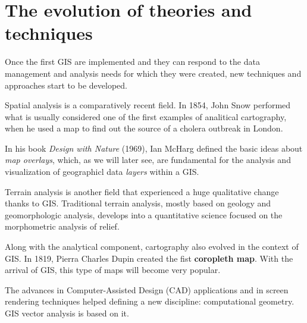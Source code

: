 \section{The evolution of theories and techniques}

Once the first GIS are implemented and they can respond to the data management and analysis needs for which they were created, new techniques and approaches start to be developed. 

Spatial analysis is a comparatively recent field. In 1854, John Snow performed what is usually considered one of the first examples of analitical cartography, when he used a map to find out the source of a cholera outbreak in London.

In his book \emph{Design with Nature} (1969), Ian McHarg defined the basic ideas about  \emph{map overlays}, which, as we will later see, are fundamental for the analysis and visualization of geographicl data \emph{layers} within a GIS.

Terrain analysis is another field that experienced a huge qualitative change thanks to GIS. Traditional terrain analysis, mostly based on geology and geomorphologic analysis, develops into a quantitative science focused on the morphometric analysis of relief.

Along with the analytical component, cartography also evolved in the context of GIS. In 1819, Pierra Charles Dupin created the fist \textbf{coropleth map}. With the arrival of GIS, this type of maps will become very popular.

The advances in Computer-Assisted Design (CAD) applications and in screen rendering techniques helped defining a new discipline: computational geometry. GIS vector analysis is based on it.

\pagestyle{empty}
